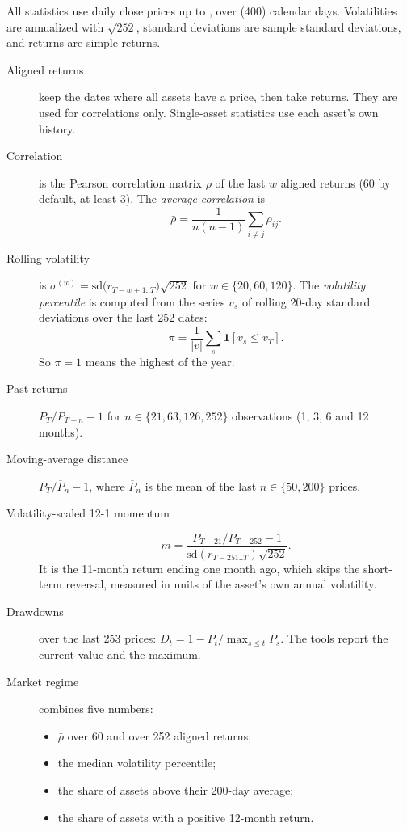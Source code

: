 All statistics use daily close prices up to , over
 (400) calendar days. Volatilities are annualized with
$\sqrt{252}$, standard deviations are sample standard deviations, and returns are simple
returns.
\begin{description}
  \item[Aligned returns] keep the dates where all assets have a price, then take returns.
        They are used for correlations only. Single-asset statistics use each asset's own
        history.
  \item[Correlation] is the Pearson correlation matrix $\rho$ of the last $w$ aligned
        returns (60 by default, at least 3). The \emph{average correlation} is
        \[
          \bar\rho=\frac{1}{n(n-1)}\sum_{i\ne j}\rho_{ij}.
        \]
  \item[Rolling volatility] is
        $\sigma^{(w)}=\mathrm{sd}\big(r_{T-w+1..T}\big)\sqrt{252}$ for
        $w\in\{20,60,120\}$. The \emph{volatility percentile} is computed from the series
        $v_s$ of rolling 20-day standard deviations over the last 252 dates:
        \[
          \pi=\frac{1}{|v|}\sum_s\mathbf 1[v_s\le v_T].
        \]
        So $\pi=1$ means the highest of the year.
  \item[Past returns] $P_T/P_{T-n}-1$ for $n\in\{21,63,126,252\}$ observations
        (1, 3, 6 and 12 months).
  \item[Moving-average distance] $P_T/\overline P_n-1$, where $\overline P_n$ is the mean
        of the last $n\in\{50,200\}$ prices.
  \item[Volatility-scaled 12-1 momentum]
        \[
          m=\frac{P_{T-21}/P_{T-252}-1}{\mathrm{sd}(r_{T-251..T})\sqrt{252}} .
        \]
        It is the 11-month return ending one month ago, which skips the short-term
        reversal, measured in units of the asset's own annual volatility.
  \item[Drawdowns] over the last 253 prices: $D_t=1-P_t/\max_{s\le t}P_s$. The tools
        report the current value and the maximum.
  \item[Market regime] combines five numbers:
        \begin{itemize}
          \item $\bar\rho$ over 60 and over 252 aligned returns;
          \item the median volatility percentile;
          \item the share of assets above their 200-day average;
          \item the share of assets with a positive 12-month return.
        \end{itemize}
\end{description}
\begin{codepointers}
\end{codepointers}
